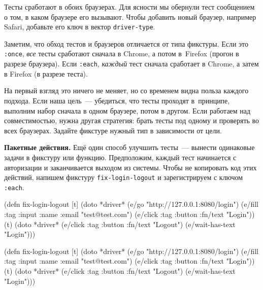 \fi

Тесты сработают в обоих браузерах. Для ясности мы обернули тест сообщением о
том, в каком браузере его вызывают. Чтобы добавить новый браузер, например
Safari, добавьте его ключ в вектор \verb|driver-type|.


Заметим, что обход тестов и браузеров отличается от типа фикстуры. Если это
\verb|:once|, \emph{все} тесты сработают сначала в Chrome, а потом в~Firefox
(прогон в разрезе браузера). Если \verb|:each|, \emph{каждый} тест сначала
сработает в Chrome, а затем в Firefox (в разрезе теста).

На первый взгляд это ничего не меняет, но со временем видна польза каждого
подхода. Если наша цель~--- убедиться, что тесты проходят в~принципе, выполним набор
сначала в одном браузере, потом в другом. Если работаем над совместимостью,
нужна другая стратегия: брать тесты под одному и проверять во всех
браузерах. Задайте фикстуре нужный тип в зависимости от цели.

\textbf{Пакетные действия.} Ещё один способ улучшить тесты~--- вынести
одинаковые задачи в фикстуру или функцию. Предположим, каждый тест начинается с
авторизации и заканчивается выходом из системы. Чтобы не копировать код этих
действий, напишем фикстуру \verb|fix-login-logout| и зарегистрируем с ключом
\verb|:each|.

\ifx\devicetype\mobile

\begin{english}
  \begin{clojure}
(defn fix-login-logout [t]
  (doto *driver*
    (e/go "http://127.0.0.1:8080/login")
    (e/fill {:tag :input :name :email}
      "test@test.com")
    (e/click
      {:tag :button :fn/text "Login"}))
  (t)
  (doto *driver*
    (e/click {:tag :button
              :fn/text "Logout"})
    (e/wait-has-text "Login")))
  \end{clojure}
\end{english}

\else

\begin{english}
  \begin{clojure}
(defn fix-login-logout [t]
  (doto *driver*
    (e/go "http://127.0.0.1:8080/login")
    (e/fill {:tag :input
             :name :email} "test@test.com")
    (e/click {:tag :button
              :fn/text "Login"}))
  (t)
  (doto *driver*
    (e/click {:tag :button
              :fn/text "Logout"})
    (e/wait-has-text "Login")))
  \end{clojure}
\end{english}

